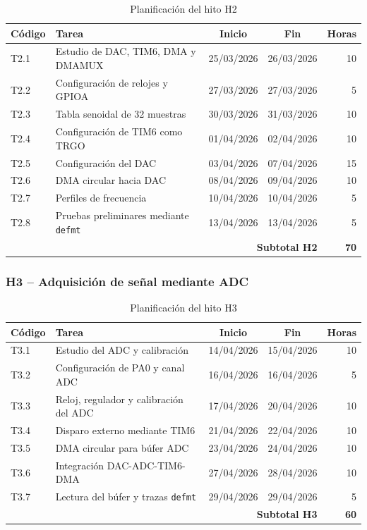 \documentclass[11pt,a4paper]{article}
\begin{document}
\begin{table}[H]
\centering
\small
\begin{tabularx}{\textwidth}{lXccr}
\toprule
\textbf{Código} & \textbf{Tarea} & \textbf{Inicio} & \textbf{Fin} & \textbf{Horas} \\
\midrule
T2.1 & Estudio de DAC, TIM6, DMA y DMAMUX & 25/03/2026 & 26/03/2026 & 10 \\
T2.2 & Configuración de relojes y GPIOA & 27/03/2026 & 27/03/2026 & 5 \\
T2.3 & Tabla senoidal de 32 muestras & 30/03/2026 & 31/03/2026 & 10 \\
T2.4 & Configuración de TIM6 como TRGO & 01/04/2026 & 02/04/2026 & 10 \\
T2.5 & Configuración del DAC & 03/04/2026 & 07/04/2026 & 15 \\
T2.6 & DMA circular hacia DAC & 08/04/2026 & 09/04/2026 & 10 \\
T2.7 & Perfiles de frecuencia & 10/04/2026 & 10/04/2026 & 5 \\
T2.8 & Pruebas preliminares mediante \texttt{defmt} & 13/04/2026 & 13/04/2026 & 5 \\
\midrule
\multicolumn{4}{r}{\textbf{Subtotal H2}} & \textbf{70} \\
\bottomrule
\end{tabularx}
\caption{Planificación del hito H2}
\label{tab:hito2}
\end{table}

\subsubsection{H3 -- Adquisición de señal mediante ADC}

\begin{table}[H]
\centering
\small
\begin{tabularx}{\textwidth}{lXccr}
\toprule
\textbf{Código} & \textbf{Tarea} & \textbf{Inicio} & \textbf{Fin} & \textbf{Horas} \\
\midrule
T3.1 & Estudio del ADC y calibración & 14/04/2026 & 15/04/2026 & 10 \\
T3.2 & Configuración de PA0 y canal ADC & 16/04/2026 & 16/04/2026 & 5 \\
T3.3 & Reloj, regulador y calibración del ADC & 17/04/2026 & 20/04/2026 & 10 \\
T3.4 & Disparo externo mediante TIM6 & 21/04/2026 & 22/04/2026 & 10 \\
T3.5 & DMA circular para búfer ADC & 23/04/2026 & 24/04/2026 & 10 \\
T3.6 & Integración DAC-ADC-TIM6-DMA & 27/04/2026 & 28/04/2026 & 10 \\
T3.7 & Lectura del búfer y trazas \texttt{defmt} & 29/04/2026 & 29/04/2026 & 5 \\
\midrule
\multicolumn{4}{r}{\textbf{Subtotal H3}} & \textbf{60} \\
\bottomrule
\end{tabularx}
\caption{Planificación del hito H3}
\label{tab:hito3}
\end{table}
\end{document}
